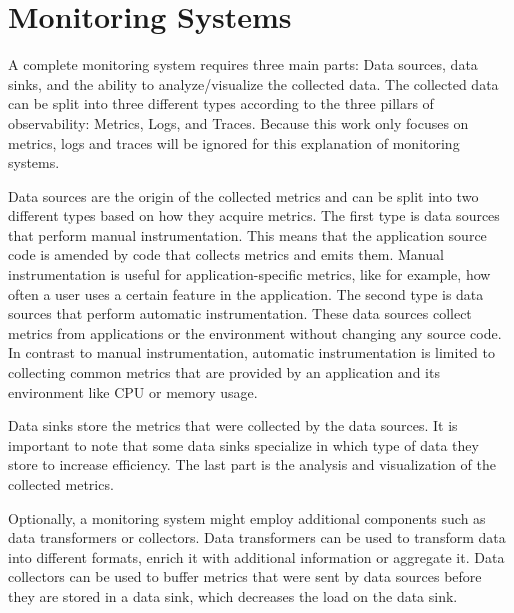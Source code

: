 \section{Monitoring Systems}
\label{sec:tech_monitoring_systems}


A complete monitoring system requires three main parts: Data sources, data sinks, and the ability
to analyze/visualize the collected data.
The collected data can be split into three different types
according to the three pillars of observability: Metrics, Logs, and Traces.
Because this work only focuses on metrics, logs and traces will be ignored for this explanation of monitoring systems.

Data sources are the origin of the collected metrics and can be split into two different types
based on how they acquire metrics. The first type is data sources that perform manual instrumentation.
This means that the application source code is amended by code that collects metrics and emits them.
Manual instrumentation is useful for application-specific metrics, like for example, how often a user
uses a certain feature in the application.
The second type is data sources that perform automatic instrumentation.
These data sources collect metrics from applications or the environment without changing any source code.
In contrast to manual instrumentation, automatic instrumentation is limited to collecting
common metrics that are provided by an application and its environment like CPU or memory usage.

Data sinks store the metrics that were collected by the data sources.
It is important to note that some data sinks specialize in which type of data they store
to increase efficiency. The last part is the analysis and visualization of the collected metrics.

Optionally, a monitoring system might employ additional components such as data transformers or collectors.
Data transformers can be used to transform data into different formats, enrich it with additional information
or aggregate it.
Data collectors can be used to buffer metrics that were sent by data sources before they are stored in a data sink,
which decreases the load on the data sink.



